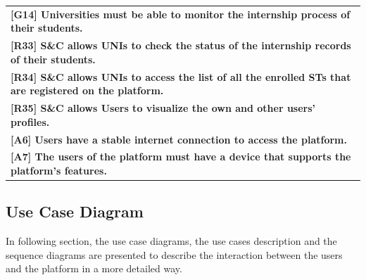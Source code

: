\begin{center}
    \begin{tabular}{|p{37em}|}
        \rowcolor{bluepoli!40} %
        \hline
        \textbf{[G14] Universities must be able to monitor the internship process of their students.} \\
        \rowcolor{bluepoli!15}
        \textbf{[R33] S\&C allows UNIs to check the status of the internship records of their students.} \\
        \rowcolor{bluepoli!15}
        \textbf{[R34] S\&C allows UNIs to access the list of all the enrolled STs that are registered on the platform.} \\
        \rowcolor{bluepoli!15}
        \textbf{[R35] S\&C allows Users to visualize the own and other users' profiles.} \\
        \textbf{[A6] Users have a stable internet connection to access the platform.}\\
        \textbf{[A7] The users of the platform must have a device that supports the platform's features.}\\
        \hline
    \end{tabular}
\end{center}

\subsection{Use Case Diagram}
In following section, the use case diagrams, the use cases description and the sequence diagrams are presented to describe 
the interaction between the users and the platform in a more detailed way.

